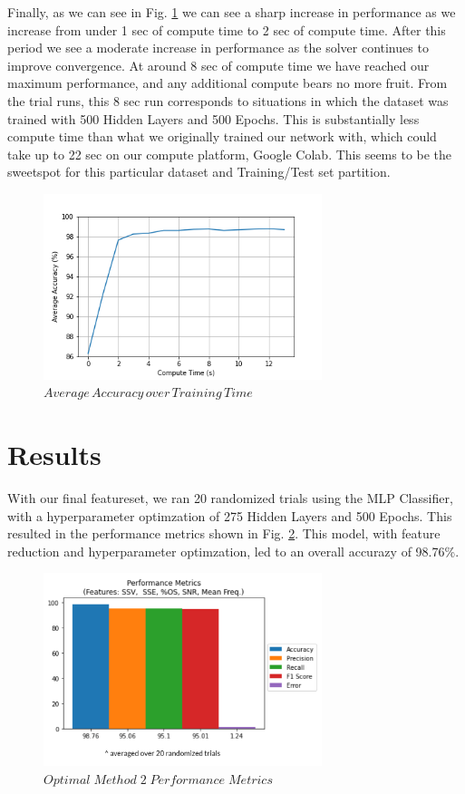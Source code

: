 \documentclass[conference]{IEEEtran}
\begin{document}
Finally, as we can see in  Fig. \ref{fig:TimePerf} we can see a sharp increase in performance as we increase from under 1 sec of compute time to 2 sec of compute time. After this period we see a moderate increase in performance as the solver continues to improve convergence. At around 8 sec of compute time we have reached our maximum performance, and any additional compute bears no more fruit. From the trial runs, this 8 sec run corresponds to situations in which the dataset was trained with 500 Hidden Layers and 500 Epochs. This is substantially less compute time than what we originally trained our network with, which could take up to 22 sec on our compute platform, Google Colab. This seems to be the sweetspot for this particular dataset and Training/Test set partition.

\begin{figure}[htb]
\centering
\includegraphics[width=3.2in]{figures/72_aa_vs_comp_time.png}
\caption{$Average\,Accuracy\,over\,Training\,Time$}
\label{fig:TimePerf}
\end{figure}

\section{Results}
With our final featureset, we ran 20 randomized trials using the MLP Classifier, with a hyperparameter optimzation of 275 Hidden Layers and 500 Epochs. This resulted in the performance metrics shown in Fig. \ref{fig:M2opt}. This model, with feature reduction and hyperparameter optimzation, led to an overall accurazy of 98.76\%.

\begin{figure}[htb]
\centering
\includegraphics[width=3.2in]{figures/100_m2optperf.png}
\caption{$Optimal\;Method\;2\;Performance\;Metrics$}
\label{fig:M2opt}
\end{figure}
\end{document}
